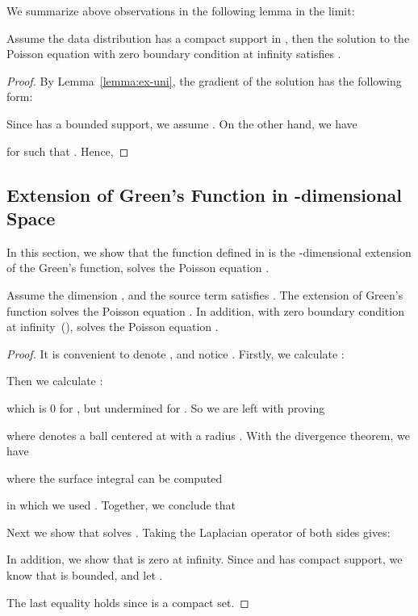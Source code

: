 We summarize above observations in the following lemma in the  limit: 
\begin{lemma}
\label{lemma:point}
Assume the data distribution  has a compact support in , then the solution  to the Poisson equation  with zero boundary condition at infinity satisfies .
\end{lemma}
\begin{proof}
By Lemma~\ref{lemma:ex-uni}, the gradient of the solution has the following form:


Since  has a bounded support, we assume . On the other hand, we have

for  such that . Hence,


\end{proof}







\subsection{{Extension of Green's Function in -dimensional Space}}
\label{app:green}
In this section, we show that the function  defined in  is the -dimensional extension of the Green's function,      solves the Poisson equation .
\begin{lemma}
\label{lemma:green}
Assume the dimension , and the source term satisfies . The extension of Green's function  solves the Poisson equation . In addition, with zero boundary condition at infinity~(),  solves the Poisson equation .
\end{lemma}

\begin{proof}
It is convenient to denote ,  and notice . Firstly, we calculate :

Then we calculate :

which is 0 for , but undermined for . So we are left with proving

where  denotes a ball centered at  with a radius . With the divergence theorem, we have

where the surface integral can be computed

in which we used . Together, we conclude that





Next we show that  solves . Taking the Laplacian operator of both sides gives:


In addition, we show that  is zero at infinity. Since  and has compact support, we know that  is bounded, and let .

The last equality holds since  is a compact set.
\end{proof}

